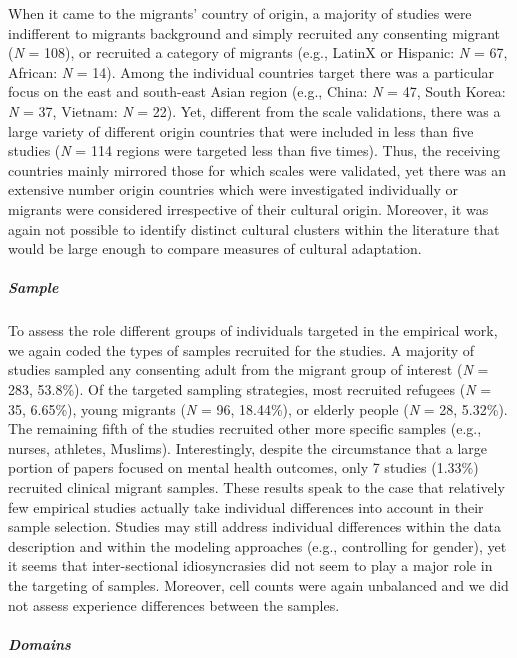 When it came to the migrants' country of origin, a majority of studies
were indifferent to migrants background and simply recruited any
consenting migrant (\textit{N} = 108), or recruited a category of
migrants (e.g., LatinX or Hispanic: \textit{N} = 67, African: \textit{N}
= 14). Among the individual countries target there was a particular
focus on the east and south-east Asian region (e.g., China: \textit{N} =
47, South Korea: \textit{N} = 37, Vietnam: \textit{N} = 22). Yet,
different from the scale validations, there was a large variety of
different origin countries that were included in less than five studies
(\textit{N} = 114 regions were targeted less than five times). Thus, the
receiving countries mainly mirrored those for which scales were
validated, yet there was an extensive number origin countries which were
investigated individually or migrants were considered irrespective of
their cultural origin. Moreover, it was again not possible to identify
distinct cultural clusters within the literature that would be large
enough to compare measures of cultural adaptation.

\subparagraph{Sample}

To assess the role different groups of individuals targeted in the
empirical work, we again coded the types of samples recruited for the
studies. A majority of studies sampled any consenting adult from the
migrant group of interest (\textit{N} = 283, 53.8\%). Of the targeted
sampling strategies, most recruited refugees (\textit{N} = 35, 6.65\%),
young migrants (\textit{N} = 96, 18.44\%), or elderly people (\textit{N}
= 28, 5.32\%). The remaining fifth of the studies recruited other more
specific samples (e.g., nurses, athletes, Muslims). Interestingly,
despite the circumstance that a large portion of papers focused on
mental health outcomes, only 7 studies (1.33\%) recruited clinical
migrant samples. These results speak to the case that relatively few
empirical studies actually take individual differences into account in
their sample selection. Studies may still address individual differences
within the data description and within the modeling approaches (e.g.,
controlling for gender), yet it seems that inter-sectional
idiosyncrasies did not seem to play a major role in the targeting of
samples. Moreover, cell counts were again unbalanced and we did not
assess experience differences between the samples.

\subparagraph{Domains}


